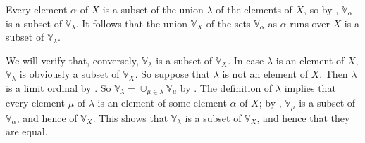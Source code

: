 \documentclass{article}
\begin{document}
\begin{solution}[\ref{exe:jmxnb6v7}]
  \label{sol:gq5m8lha}
  Every element \(\alpha\) of \(X\) is a subset of the union
  \(\lambda\) of the elements of \(X\), so by ,
  \(\mathbb{V}_\alpha\) is a subset of \(\mathbb{V}_\lambda\).  It
  follows that the union \(\mathbb{V}_X\) of the sets
  \(\mathbb{V}_\alpha\) as \(\alpha\) runs over \(X\) is a subset of
  \(\mathbb{V}_\lambda\).

  We will verify that, conversely, \(\mathbb{V}_\lambda\) is a subset
  of \(\mathbb{V}_X\).  In case \(\lambda\) is an element of \(X\),
  \(\mathbb{V}_\lambda\) is obviously a subset of \(\mathbb{V}_X\).
  So suppose that \(\lambda\) is not an element of \(X\).  Then
  \(\lambda\) is a limit ordinal by .  So
  \(\mathbb{V}_\lambda = \cup_{\mu \in \lambda} \mathbb{V}_\mu\) by
  .  The definition of \(\lambda\) implies that
  every element \(\mu\) of \(\lambda\) is an element of some element
  \(\alpha\) of \(X\); by , \(\mathbb{V}_\mu\) is a
  subset of \(\mathbb{V}_\alpha\), and hence of \(\mathbb{V}_X\).
  This shows that \(\mathbb{V}_\lambda\) is a subset of
  \(\mathbb{V}_X\), and hence that they are equal.
\end{solution}

\bibsection
\end{document}
